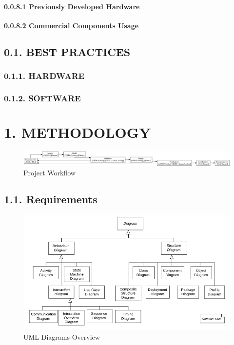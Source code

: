 \documentclass[]{article}
\let\oldparagraph\paragraph
\renewcommand{\paragraph}[1]{\oldparagraph{#1}\mbox{}}
\begin{document}
\paragraph{0.0.8.1 Previously Developed
Hardware}\label{previously-developed-hardware}

\paragraph{0.0.8.2 Commercial Components
Usage}\label{commercial-components-usage}

\subsection{0.1. BEST PRACTICES}\label{best-practices}

\subsubsection{0.1.1. HARDWARE}\label{hardware}

\subsubsection{0.1.2. SOFTWARE}\label{software}

\section{1. METHODOLOGY}\label{methodology}

\begin{figure}
\centering
\includegraphics{../doc/project.png}
\caption{Project Workflow}
\end{figure}

\subsection{1.1. Requirements}\label{requirements}

\begin{figure}
\centering
\includegraphics{../requirements/uml_diagrams_overview.png}
\caption{UML Diagrams Overview}
\end{figure}
\end{document}
